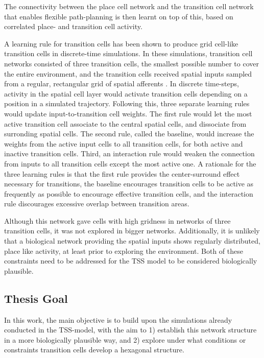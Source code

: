 \documentclass{article}
\begin{document}
    The connectivity between the place cell network and the transition cell network that enables flexible path-planning is then learnt on top of this, based on correlated place- and transition cell activity.

    A learning rule for transition cells has been shown to produce grid cell-like transition cells in discrete-time simulations. In these simulations, transition cell networks consisted of three transition cells, the smallest possible number to cover the entire environment, and the transition cells received spatial inputs sampled from a regular, rectangular grid of spatial afferents \parencite{Waniek2017}. In discrete time-steps, activity in the spatial cell layer would activate transition cells depending on a position in a simulated trajectory. Following this, three separate learning rules would update input-to-transition cell weights. The first rule would let the most active transition cell associate to the central spatial cells, and dissociate from surronding spatial cells. The second rule, called the baseline, would increase the weights from the active input cells to all transition cells, for both active and inactive transition cells. Third, an interaction rule would weaken the connection from inputs to all transition cells except the most active one.
    A rationale for the three learning rules is that the first rule provides the center-surround effect necessary for transitions, the baseline encourages transition cells to be active as frequently as possible to encourage effective transition cells, and the interaction rule discourages excessive overlap between transition areas.
    
    Although this network gave cells with high gridness in networks of three transition cells, it was not explored in bigger networks. Additionally, it is unlikely that a biological network providing the spatial inputs shows regularly distributed, place like activity, at least prior to exploring the environment. Both of these constraints need to be addressed for the TSS model to be considered biologically plausible.

    \subsection{Thesis Goal} \label{Thesis Goal}
    In this work, the main objective is to build upon the simulations already conducted in the TSS-model, with the aim to 1) establish this network structure in a more biologically plausible way, and 2) explore under what conditions or constraints transition cells develop a hexagonal structure.
\end{document}
